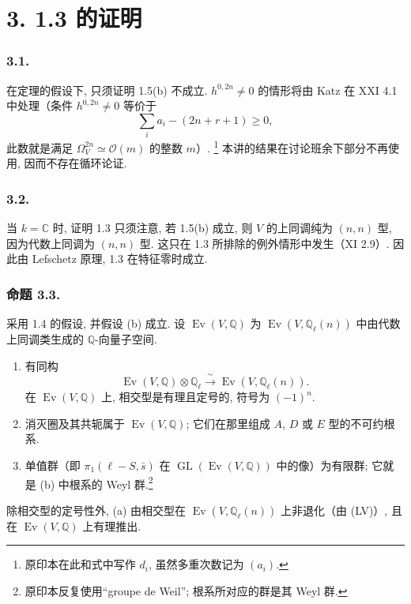 \section*{3. 1.3 的证明}

\subsubsection*{3.1.}
在定理的假设下, 只须证明 1.5(b) 不成立. $h^{0,2n}\ne0$ 的情形将由 Katz 在 XXI 4.1 中处理（条件 $h^{0,2n}\ne0$ 等价于
\[
  \sum_i a_i-(2n+r+1)\geq0,
\]
此数就是满足 $\Omega_V^{2n}\simeq\mathcal O(m)$ 的整数 $m$）.
\footnote{原印本在此和式中写作 $d_i$, 虽然多重次数记为 $(a_i)$.}
本讲的结果在讨论班余下部分不再使用, 因而不存在循环论证.

\subsubsection*{3.2.}
当 $k=\mathbb C$ 时, 证明 1.3 只须注意, 若 1.5(b) 成立, 则 $V$ 的上同调纯为 $(n,n)$ 型, 因为代数上同调为 $(n,n)$ 型. 这只在 1.3 所排除的例外情形中发生（XI 2.9）. 因此由 Lefschetz 原理, 1.3 在特征零时成立.

\subsubsection*{命题 3.3.}
采用 1.4 的假设, 并假设 (b) 成立. 设 $\operatorname{Ev}(V,\mathbb Q)$ 为 $\operatorname{Ev}(V,\mathbb Q_\ell(n))$ 中由代数上同调类生成的 $\mathbb Q$-向量子空间.

\begin{enumerate}[label=(\alph*)]
\item 有同构
  \[
  \operatorname{Ev}(V,\mathbb Q)\otimes\mathbb Q_\ell
  \xrightarrow{\ \sim\ }
  \operatorname{Ev}(V,\mathbb Q_\ell(n)).
  \]
  在 $\operatorname{Ev}(V,\mathbb Q)$ 上, 相交型是有理且定号的, 符号为 $(-1)^n$.
\item 消灭圈及其共轭属于 $\operatorname{Ev}(V,\mathbb Q)$; 它们在那里组成 $A$, $D$ 或 $E$ 型的不可约根系.
\item 单值群（即 $\pi_1(\ell-S,\bar s)$ 在 $\operatorname{GL}(\operatorname{Ev}(V,\mathbb Q))$ 中的像）为有限群; 它就是 (b) 中根系的 Weyl 群.\footnote{原印本反复使用“groupe de Weil”; 根系所对应的群是其 Weyl 群.}
\end{enumerate}

除相交型的定号性外, (a) 由相交型在 $\operatorname{Ev}(V,\mathbb Q_\ell(n))$ 上非退化（由 (LV)）, 且在 $\operatorname{Ev}(V,\mathbb Q)$ 上有理推出.

